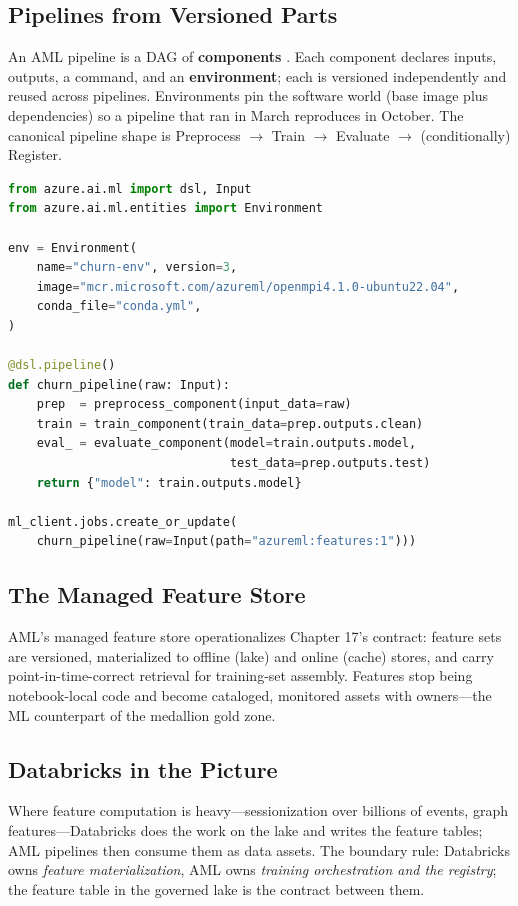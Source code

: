 \subsection{Pipelines from Versioned Parts}
An AML pipeline is a DAG of \textbf{components} \cite{microsoft2025amlPipelines}. Each component declares inputs, outputs, a command, and an \textbf{environment}; each is versioned independently and reused across pipelines. Environments pin the software world (base image plus dependencies) so a pipeline that ran in March reproduces in October. The canonical pipeline shape is Preprocess $\rightarrow$ Train $\rightarrow$ Evaluate $\rightarrow$ (conditionally) Register.

\begin{lstlisting}[language=Python,caption={An AML pipeline assembled from registered components via the v2 SDK.},label={lst:ch18-pipeline}]
from azure.ai.ml import dsl, Input
from azure.ai.ml.entities import Environment

env = Environment(
    name="churn-env", version=3,
    image="mcr.microsoft.com/azureml/openmpi4.1.0-ubuntu22.04",
    conda_file="conda.yml",
)

@dsl.pipeline()
def churn_pipeline(raw: Input):
    prep  = preprocess_component(input_data=raw)
    train = train_component(train_data=prep.outputs.clean)
    eval_ = evaluate_component(model=train.outputs.model,
                               test_data=prep.outputs.test)
    return {"model": train.outputs.model}

ml_client.jobs.create_or_update(
    churn_pipeline(raw=Input(path="azureml:features:1")))
\end{lstlisting}

\subsection{The Managed Feature Store}
AML's managed feature store operationalizes Chapter 17's contract: feature sets are versioned, materialized to offline (lake) and online (cache) stores, and carry point-in-time-correct retrieval for training-set assembly. Features stop being notebook-local code and become cataloged, monitored assets with owners---the ML counterpart of the medallion gold zone.

\subsection{Databricks in the Picture}
Where feature computation is heavy---sessionization over billions of events, graph features---Databricks does the work on the lake and writes the feature tables; AML pipelines then consume them as data assets. The boundary rule: Databricks owns \emph{feature materialization}, AML owns \emph{training orchestration and the registry}; the feature table in the governed lake is the contract between them.

